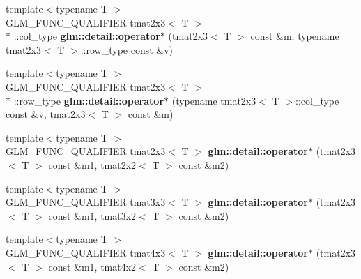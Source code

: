 \begin{DoxyCompactItemize}
\item 
\hypertarget{namespaceglm_1_1detail_a65b32cbf66eb420c4c891b0d10d64cd7}{{\footnotesize template$<$typename T $>$ }\\G\-L\-M\-\_\-\-F\-U\-N\-C\-\_\-\-Q\-U\-A\-L\-I\-F\-I\-E\-R tmat2x3$<$ T $>$\\*
\-::col\-\_\-type {\bfseries glm\-::detail\-::operator$\ast$} (tmat2x3$<$ T $>$ const \&m, typename tmat2x3$<$ T $>$\-::row\-\_\-type const \&v)}\label{namespaceglm_1_1detail_a65b32cbf66eb420c4c891b0d10d64cd7}

\item 
\hypertarget{namespaceglm_1_1detail_abc7fcb10389c59b1218f02eb32f52361}{{\footnotesize template$<$typename T $>$ }\\G\-L\-M\-\_\-\-F\-U\-N\-C\-\_\-\-Q\-U\-A\-L\-I\-F\-I\-E\-R tmat2x3$<$ T $>$\\*
\-::row\-\_\-type {\bfseries glm\-::detail\-::operator$\ast$} (typename tmat2x3$<$ T $>$\-::col\-\_\-type const \&v, tmat2x3$<$ T $>$ const \&m)}\label{namespaceglm_1_1detail_abc7fcb10389c59b1218f02eb32f52361}

\item 
\hypertarget{namespaceglm_1_1detail_a5fc83287be590de2728efc949f0b1725}{{\footnotesize template$<$typename T $>$ }\\G\-L\-M\-\_\-\-F\-U\-N\-C\-\_\-\-Q\-U\-A\-L\-I\-F\-I\-E\-R tmat2x3$<$ T $>$ {\bfseries glm\-::detail\-::operator$\ast$} (tmat2x3$<$ T $>$ const \&m1, tmat2x2$<$ T $>$ const \&m2)}\label{namespaceglm_1_1detail_a5fc83287be590de2728efc949f0b1725}

\item 
\hypertarget{namespaceglm_1_1detail_adb83cc2e3f78294af7e5cc32fafa42e6}{{\footnotesize template$<$typename T $>$ }\\G\-L\-M\-\_\-\-F\-U\-N\-C\-\_\-\-Q\-U\-A\-L\-I\-F\-I\-E\-R tmat3x3$<$ T $>$ {\bfseries glm\-::detail\-::operator$\ast$} (tmat2x3$<$ T $>$ const \&m1, tmat3x2$<$ T $>$ const \&m2)}\label{namespaceglm_1_1detail_adb83cc2e3f78294af7e5cc32fafa42e6}

\item 
\hypertarget{namespaceglm_1_1detail_ace87d0c43f31221f6da2943730e4aa28}{{\footnotesize template$<$typename T $>$ }\\G\-L\-M\-\_\-\-F\-U\-N\-C\-\_\-\-Q\-U\-A\-L\-I\-F\-I\-E\-R tmat4x3$<$ T $>$ {\bfseries glm\-::detail\-::operator$\ast$} (tmat2x3$<$ T $>$ const \&m1, tmat4x2$<$ T $>$ const \&m2)}\label{namespaceglm_1_1detail_ace87d0c43f31221f6da2943730e4aa28}


\end{DoxyCompactItemize}
